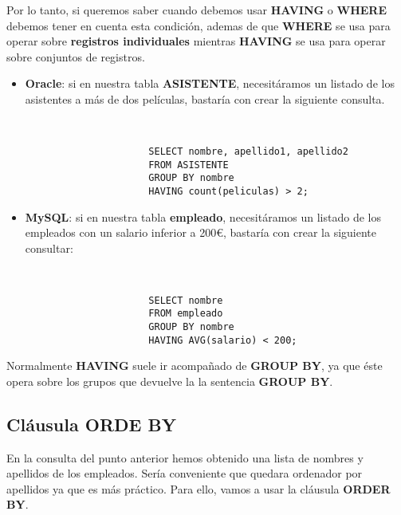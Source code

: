 Por lo tanto, si queremos saber cuando debemos usar \textbf{HAVING} o \textbf{WHERE} debemos tener en cuenta esta condición, ademas de que \textbf{WHERE} se usa para operar sobre \textbf{registros individuales} mientras \textbf{HAVING} se usa para operar sobre conjuntos de registros.

\begin{itemize}
    \item \textbf{Oracle}: si en nuestra tabla \textbf{ASISTENTE}, necesitáramos un listado de los asistentes a más de dos películas, bastaría con crear la siguiente consulta.

    \begin{figure}[H]
        \begin{tcolorbox}[sharp corners, colback=yellow!30, colframe=white!20]
            \scriptsize
            \begin{verbatim}


                SELECT nombre, apellido1, apellido2
                FROM ASISTENTE
                GROUP BY nombre
                HAVING count(peliculas) > 2;
            \end{verbatim}
        \end{tcolorbox}
    \end{figure}

    \item \textbf{MySQL}: si en nuestra tabla \textbf{empleado}, necesitáramos un listado de los empleados con un salario inferior a 200€, bastaría con crear la siguiente consultar:

    \begin{figure}[H]
        \begin{tcolorbox}[sharp corners, colback=yellow!30, colframe=white!20]
            \scriptsize
            \begin{verbatim}


                SELECT nombre
                FROM empleado
                GROUP BY nombre
                HAVING AVG(salario) < 200;
            \end{verbatim}
        \end{tcolorbox}
    \end{figure}
\end{itemize}

Normalmente \textbf{HAVING} suele ir acompañado de \textbf{GROUP BY}, ya que éste opera sobre los grupos que devuelve la la sentencia \textbf{GROUP BY}.

\subsection{Cláusula ORDE BY}
En la consulta del punto anterior hemos obtenido una lista de nombres y apellidos de los empleados. Sería conveniente que quedara ordenador por apellidos ya que es más práctico. Para ello, vamos a usar la cláusula \textbf{ORDER BY}.

